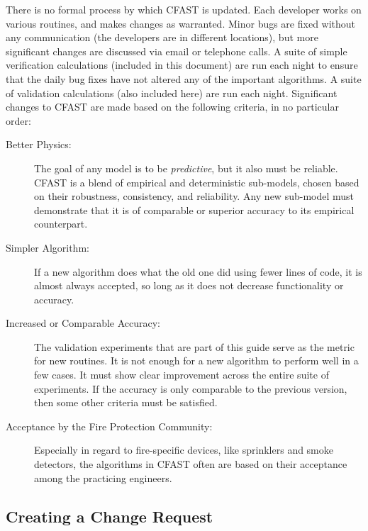 There is no formal process by which CFAST is updated. Each developer works on various routines, and makes changes as warranted. Minor bugs are fixed without any communication (the developers are in different locations), but more significant changes are discussed via email or telephone calls. A suite of simple verification calculations (included in this document) are run each night to ensure that the daily bug fixes have not altered any of the important algorithms. A suite of validation calculations (also included here) are run each night. Significant changes to CFAST are made based on the following criteria, in no particular order:
\begin{description}
\item[Better Physics:] The goal of any model is to be {\em predictive}, but it also must be reliable. CFAST is a blend of empirical and deterministic sub-models, chosen based on their robustness, consistency, and reliability. Any new sub-model must demonstrate that it is of comparable or superior accuracy to its empirical counterpart.
\item[Simpler Algorithm:] If a new algorithm does what the old one did using fewer lines of code, it is almost always accepted, so long as it does not decrease functionality or accuracy.
\item[Increased or Comparable Accuracy:] The validation experiments that are part of this guide serve as the metric for new routines. It is not enough for a new algorithm to perform well in a few cases. It must show clear improvement across the entire suite of experiments. If the accuracy is only comparable to the previous version, then some other criteria must be satisfied.
\item[Acceptance by the Fire Protection Community:] Especially in regard to fire-specific devices, like sprinklers and smoke detectors, the algorithms in CFAST often are based on their acceptance among the practicing engineers.
\end{description}

\subsection{Creating a Change Request}

